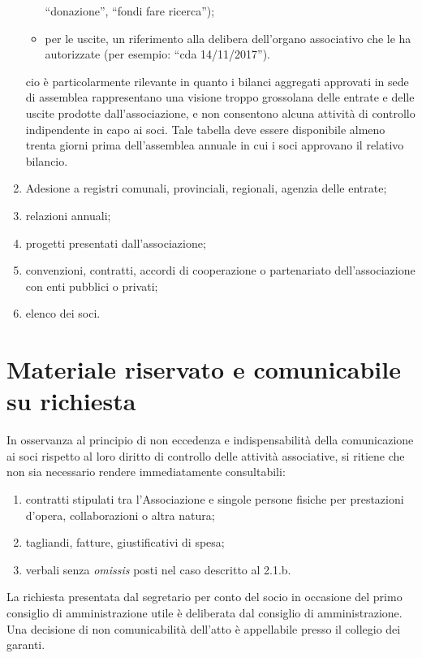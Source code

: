 \begin{enumerate}
\begin{itemize}
                ``donazione'', ``fondi fare ricerca'');
            \item per le uscite, un riferimento alla delibera dell'organo
                associativo che le ha autorizzate (per esempio: ``cda
                14/11/2017'').
        \end{itemize}
        cio è particolarmente rilevante in quanto i bilanci aggregati
        approvati in sede di assemblea rappresentano una visione troppo
        grossolana delle entrate e delle uscite prodotte dall'associazione, e
        non consentono alcuna attività di controllo indipendente in capo ai
        soci. Tale tabella deve essere disponibile almeno trenta giorni prima
        dell'assemblea annuale in cui i soci approvano il relativo bilancio.
    \item
        Adesione a registri comunali, provinciali, regionali, agenzia delle
        entrate;
    \item
        relazioni annuali;
    \item
        progetti presentati dall'associazione;
    \item
        convenzioni, contratti, accordi di cooperazione o partenariato
        dell'associazione con enti pubblici o privati;
    \item
        elenco dei soci.
\end{enumerate}

\section{Materiale riservato e comunicabile su
richiesta}\label{materiale-riservato-e-comunicabile-su-richiesta}

In osservanza al principio di non eccedenza e indispensabilità della
comunicazione ai soci rispetto al loro diritto di controllo delle
attività associative, si ritiene che non sia necessario rendere
immediatamente consultabili:

\begin{enumerate}
    \item
        contratti stipulati tra l'Associazione e singole persone fisiche per
        prestazioni d'opera, collaborazioni o altra natura;
    \item
        tagliandi, fatture, giustificativi di spesa;
    \item
        verbali senza \emph{omissis} posti nel caso descritto al 2.1.b.
\end{enumerate}

La richiesta presentata dal segretario per conto del socio in occasione
del primo consiglio di amministrazione utile è deliberata dal consiglio
di amministrazione. Una decisione di non comunicabilità dell'atto è
appellabile presso il collegio dei garanti.

